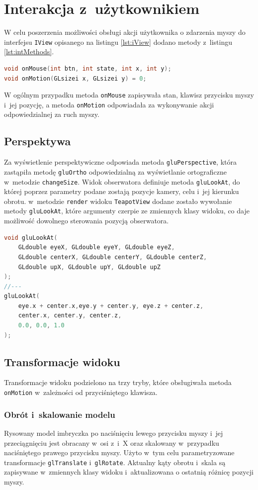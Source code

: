 \newpage
\section{Interakcja z~użytkownikiem}
W celu poszerzenia możliwości obsługi akcji użytkownika o zdarzenia myszy do interfejsu \lstinline{IView} opisanego na listingu \ref{lst:iView} dodano metody z~listingu \ref{lst:intMethods}.

\begin{lstlisting}[language=C++, caption=Metody interfejsu IView do obsługi zdarzeń myszy., label={lst:intMethods}]
void onMouse(int btn, int state, int x, int y);
void onMotion(GLsizei x, GLsizei y) = 0;
\end{lstlisting}
W ogólnym przypadku metoda \lstinline{onMouse} zapisywała stan, klawisz przycisku myszy i~jej pozycję, a metoda \lstinline{onMotion} odpowiadała za wykonywanie akcji odpowiedzialnej za ruch myszy.
\subsection{Perspektywa}
Za wyświetlenie perspektywiczne odpowiada metoda \lstinline{gluPerspective}, która zastąpiła metodę \lstinline{gluOrtho} odpowiedzialną za wyświetlanie ortograficzne w~metodzie \lstinline{changeSize}. Widok obserwatora definiuje metoda \lstinline{gluLookAt}, do której poprzez parametry podane zostają pozycje kamery, celu i~jej kierunku obrotu. w~metodzie \lstinline{render} widoku \lstinline{TeapotView} dodane zostało wywołanie metody \lstinline{gluLookAt}, które argumenty czerpie ze zmiennych klasy widoku, co daje możliwość dowolnego sterowania pozycją obserwatora.
\begin{lstlisting}[language=C++, caption=Definicja i~wywołanie metody \lstinline{gluLookAt}., label={lst:intGluLookAt}]
void gluLookAt(
    GLdouble eyeX, GLdouble eyeY, GLdouble eyeZ,
    GLdouble centerX, GLdouble centerY, GLdouble centerZ,
    GLdouble upX, GLdouble upY, GLdouble upZ
);
//---
gluLookAt(
    eye.x + center.x,eye.y + center.y, eye.z + center.z,
    center.x, center.y, center.z,
    0.0, 0.0, 1.0
);
\end{lstlisting}
\subsection{Transformacje widoku}
Transformacje widoku podzielono na trzy tryby, które obsługiwała metoda \lstinline{onMotion} w~zależności od przyciśniętego klawisza.
\subsubsection{Obrót i~skalowanie modelu}
Rysowany model imbryczka po naciśnięciu lewego przycisku myszy i~jej przeciągnięciu jest obracany w~osi z~i~X oraz skalowany w~przypadku naciśniętego prawego przycisku myszy. Użyto w~tym celu parametryzowane transformacje \lstinline{glTranslate} i~\lstinline{glRotate}. Aktualny kąty obrotu i~skala są zapisywane w~zmiennych klasy widoku i~aktualizowana o ostatnią różnicę pozycji myszy.
